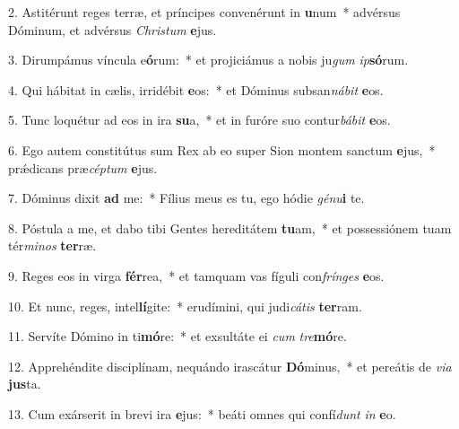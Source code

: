 2. Astitérunt reges terræ, et príncipes convenérunt in \textbf{u}num~*  advérsus Dóminum, et advérsus \textit{Chris}\textit{tum} \textbf{e}jus.\

3. Dirumpámus víncula e\textbf{ó}rum:~*  et projiciámus a nobis ju\textit{gum} \textit{ip}\textbf{só}rum.\

4. Qui hábitat in cælis, irridébit \textbf{e}os:~*  et Dóminus subsan\textit{ná}\textit{bit} \textbf{e}os.\

5. Tunc loquétur ad eos in ira \textbf{su}a,~*  et in furóre suo contur\textit{bá}\textit{bit} \textbf{e}os.\

6. Ego autem constitútus sum Rex ab eo super Sion montem sanctum \textbf{e}jus,~*  prǽdicans præ\textit{cép}\textit{tum} \textbf{e}jus.\

7. Dóminus dixit \textbf{ad} me:~*  Fílius meus es tu, ego hódie \textit{gé}\textit{nu}\textbf{i} te.\

8. Póstula a me, et dabo tibi Gentes hereditátem \textbf{tu}am,~*  et possessiónem tuam tér\textit{mi}\textit{nos} \textbf{ter}ræ.\

9. Reges eos in virga \textbf{fér}rea,~*  et tamquam vas fíguli con\textit{frín}\textit{ges} \textbf{e}os.\

10. Et nunc, reges, intel\textbf{lí}gite:~*  erudímini, qui judi\textit{cá}\textit{tis} \textbf{ter}ram.\

11. Servíte Dómino in ti\textbf{mó}re:~*  et exsultáte ei \textit{cum} \textit{tre}\textbf{mó}re.\

12. Apprehéndite disciplínam, nequándo irascátur \textbf{Dó}minus,~*  et pereátis de \textit{vi}\textit{a} \textbf{jus}ta.\

13. Cum exárserit in brevi ira \textbf{e}jus:~*  beáti omnes qui confí\textit{dunt} \textit{in} \textbf{e}o.\

